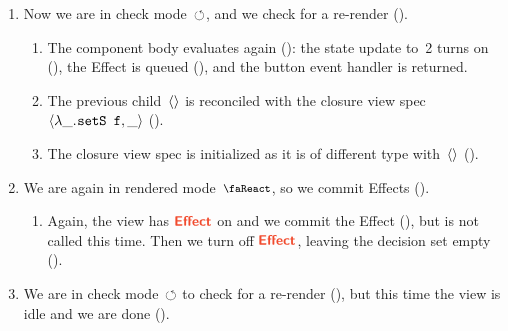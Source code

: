 \begin{enumerate}[start=0]
  \item Now we are in check mode~$\circlearrowleft$, and we check for a re-render ().
    \begin{enumerate}
      \item The component body evaluates again (): the state update to~2 turns on  (), the Effect is queued (), and the button event handler is returned.
      \item The previous child~$\langle\rangle$ is reconciled with the closure view spec~$\langle\lambda \_.\mskip 1mu\texttt{setS f}, \_\rangle$ ().
      \item The closure view spec is initialized as it is of different type with~$\langle\rangle$ ().
    \end{enumerate}

  \item We are again in rendered mode~$\rendermode$, so we commit Effects ().
    \begin{enumerate}
      \item Again, the view has $\dec{Effect}$ on and we commit the Effect (), but  is not called this time.
        Then we turn off $\dec{Effect}$, leaving the decision set empty ().
    \end{enumerate}

  \item We are in check mode~$\circlearrowleft$ to check for a re-render (), but this time the view is idle and we are done ().
\end{enumerate}
